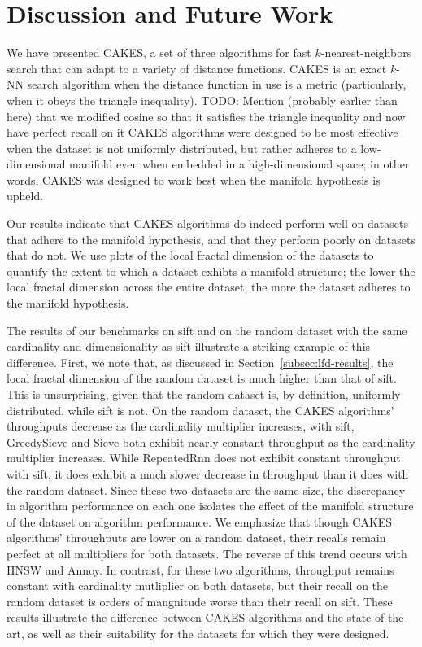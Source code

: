 \section{Discussion and Future Work}
\label{sec:discussion}

We have presented CAKES, a set of three algorithms for fast $k$-nearest-neighbors search that can adapt to a variety of distance functions.
CAKES is an exact $k$-NN search algorithm when the distance function in use is a metric (particularly, when it obeys the triangle inequality).
{\color{red} TODO: Mention (probably earlier than here) that we modified cosine so that it satisfies the triangle inequality and now have perfect recall on it}
CAKES algorithms were designed to be most effective when the dataset is not uniformly distributed, but rather adheres to a low-dimensional manifold even when embedded in a high-dimensional space; 
in other words, CAKES was designed to work best when the manifold hypothesis is upheld.

Our results indicate that CAKES algorithms do indeed perform well on datasets that adhere to the manifold hypothesis, and that they perform poorly on datasets that do not. 
We use plots of the local fractal dimension of the datasets to quantify the extent to which a dataset exhibts a manifold structure; 
the lower the local fractal dimension across the entire dataset, the more the dataset adheres to the manifold hypothesis.


The results of our benchmarks on sift and on the random dataset with the same cardinality and dimensionality as sift illustrate a striking example of this difference.
First, we note that, as discussed in Section~\ref{subsec:lfd-results}, the local fractal dimension of the random dataset is much higher than that of sift.
This is unsurprising, given that the random dataset is, by definition, uniformly distributed, while sift is not.
On the random dataset, the CAKES algorithms' throughputs decrease as the cardinality multiplier increases, with sift, GreedySieve and Sieve both exhibit nearly constant throughput as the cardinality multiplier increases.
While RepeatedRnn does not exhibit constant throughput with sift, it does exhibit a much slower decrease in throughput than it does with the random dataset.
Since these two datasets are the same size, the discrepancy in algorithm performance on each one isolates the effect of the manifold structure of the dataset on algorithm performance.
We emphasize that though CAKES algorithms' throughputs are lower on a random dataset, their recalls remain perfect at all multipliers for both datasets. 
The reverse of this trend occurs with HNSW and Annoy. 
In contrast, for these two algorithms, throughput remains constant with cardinality mutliplier on both datasets, but their recall on the random dataset is orders of mangnitude worse than their recall on sift.
These results illustrate the difference between CAKES algorithms and the state-of-the-art, as well as their suitability for the datasets for which they were designed.


